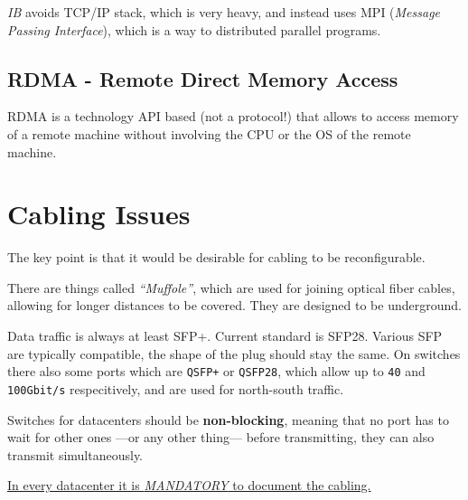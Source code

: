 \textit{IB} avoids TCP/IP stack, which is very heavy, and instead uses MPI (\textit{Message Passing Interface}), which is a way to distributed parallel programs.

\subsection{RDMA - Remote Direct Memory Access}

RDMA is a technology API based (not a protocol!) that allows to access memory of a remote machine without involving the CPU or the OS of the remote machine.

\section{Cabling Issues}
The key point is that it would be desirable for cabling to be reconfigurable.

There are things called \textit{``Muffole''}, which are used for joining optical fiber cables, allowing for longer distances to be covered.
They are designed to be underground.

Data traffic is always at least SFP+.
Current standard is SFP28. Various SFP are typically compatible, the shape of the plug should stay the same.
On switches there also some ports which are \texttt{QSFP+} or \texttt{QSFP28}, which allow up to \texttt{40} and \texttt{100Gbit/s} respecitively, and are used for north-south traffic.

Switches for datacenters should be \textbf{non-blocking}, meaning that no port has to wait for other ones ---or any other thing--- before transmitting, they can also transmit simultaneously.


\ul{In every datacenter it is \textit{MANDATORY} to document the cabling.}